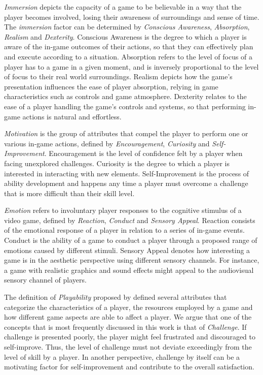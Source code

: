 \documentclass[cic,tc,english]{iiufrgs}
\begin{document}
\emph{Immersion} depicts the capacity of a game to be believable in a way that the player becomes involved, losing their awareness of surroundings and sense of time. The \emph{immersion} factor can be determined by \emph{Conscious Awareness}, \emph{Absorption}, \emph{Realism} and \emph{Dexterity}. Conscious Awareness is the degree to which a player is aware of the in-game outcomes of their actions, so that they can effectively plan and execute according to a situation. Absorption refers to the level of focus of a player has to a game in a given moment, and is inversely proportional to the level of focus to their real world surroundings. Realism depicts how the game's presentation influences the ease of player absorption, relying in game characteristics such as controls and game atmosphere. Dexterity relates to the ease of a player handling the game's controls and systems, so that performing in-game actions is natural and effortless.

\emph{Motivation} is the group of attributes that compel the player to perform one or various in-game actions, defined by \emph{Encouragement}, \emph{Curiosity} and \emph{Self-Improvement}. Encouragement is the level of confidence felt by a player when facing unexplored challenges. Curiosity is the degree to which a player is interested in interacting with new elements. Self-Improvement is the process of ability development and happens any time a player must overcome a challenge that is more difficult than their skill level. 

\emph{Emotion} refers to involuntary player responses to the cognitive stimulus of a video game, defined by \emph{Reaction}, \emph{Conduct} and \emph{Sensory Appeal}. Reaction consists of the emotional response of a player in relation to a series of in-game events. Conduct is the ability of a game to conduct a player through a proposed range of emotions caused by different stimuli. Sensory Appeal denotes how interesting a game is in the aesthetic perspective using different sensory channels. For instance, a game with realistic graphics and sound effects might appeal to the audiovisual sensory channel of players.

The definition of \emph{Playability} proposed by \citet{ARTICLE_FromUsabilityToPlayability} defined several attributes that categorize the characteristics of a player, the resources employed by a game and how different game aspects are able to affect a player. We argue that one of the concepts that is most frequently discussed in this work is that of  \emph{Challenge}. If challenge is presented poorly, the player might feel frustrated and discouraged to self-improve. Thus, the level of challenge must not deviate exceedingly from the level of skill by a player. In another perspective, challenge by itself can be a motivating factor for self-improvement and contribute to the overall satisfaction.  
\end{document}
